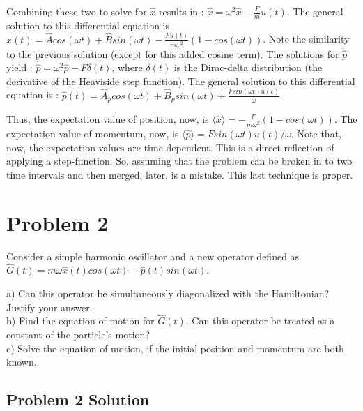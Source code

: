 \documentclass[aps,prl,preprint,groupedaddress]{revtex4-1}
\begin{document}
Combining these two to solve for $\ddot{\hat{x}}$ results in : $\ddot{\hat{x}}=\omega^2\hat{x}-\frac{F}{m}u(t)$. The general solution to this differential equation is $\hat{x}(t)= \hat{A}cos(\omega t)+\hat{B}sin(\omega t)-\frac{F u(t)}{m\omega^2}(1-cos(\omega t))$. Note the similarity to the previous solution (except for this added cosine term). The solutions for $\ddot{\hat{p}}$ yield : $\ddot{\hat{p}}=\omega^2\hat{p}-F\delta(t)$, where $\delta(t)$ is the Dirac-delta distribution (the derivative of the Heaviside step function). The general solution to this differential equation is : $\hat{p}(t)=\hat{A}_p cos(\omega t) +\hat{B}_p sin(\omega t) + \frac{F sin(\omega t) u(t)}{\omega}$.

Thus, the expectation value of position, now, is $\langle \hat{x}\rangle=-\frac{F}{m\omega^2}(1-cos(\omega t))$. The expectation value of momentum, now, is $\langle \hat{p} \rangle=F sin(\omega t) u(t)/\omega$. Note that, now, the expectation values are time dependent. This is a direct reflection of applying a step-function. So, assuming that the problem can be broken in to two time intervals and then merged, later, is a mistake. This last technique is proper.

\section{Problem 2}

Consider a simple harmonic oscillator and a new operator defined as $\hat{G}(t) = m\omega\hat{x}(t)cos(\omega t) - \hat{p}(t)sin(\omega t)$.

a) Can this operator be simultaneously diagonalized with the Hamiltonian? Justify your answer. \\
b) Find the equation of motion for $\hat{G}(t)$. Can this operator be treated as a constant of the particle's motion?\\
c) Solve the equation of motion, if the initial position and momentum are both known.

\subsection{Problem 2 Solution}

\end{document}
